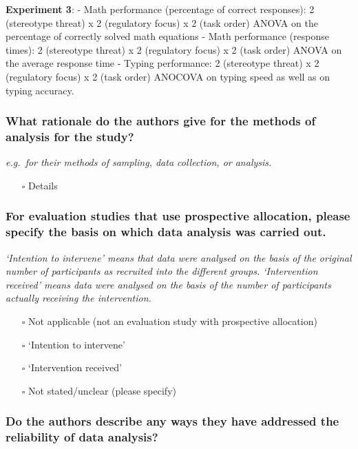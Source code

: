\documentclass[
  doc, a4paper]{apa7}
\providecommand{\tightlist}{%
  \setlength{\itemsep}{0pt}\setlength{\parskip}{0pt}}
\begin{document}
\textbf{Experiment 3}:
- Math performance (percentage of correct responses): 2 (stereotype threat) x 2 (regulatory focus) x 2 (task order) ANOVA on the percentage of correctly solved math equations
- Math performance (response times): 2 (stereotype threat) x 2 (regulatory focus) x 2 (task order) ANOVA on the average response time
- Typing performance: 2 (stereotype threat) x 2 (regulatory focus) x 2 (task order) ANOCOVA on typing speed as well as on typing accuracy.

\subsubsection{What rationale do the authors give for the methods of analysis for the study?}\label{what-rationale-do-the-authors-give-for-the-methods-of-analysis-for-the-study}

\emph{e.g.~for their methods of sampling, data collection, or analysis.}

\begin{itemize}
\tightlist
\item[$\square$]
  Details
\end{itemize}

\subsubsection{For evaluation studies that use prospective allocation, please specify the basis on which data analysis was carried out.}\label{for-evaluation-studies-that-use-prospective-allocation-please-specify-the-basis-on-which-data-analysis-was-carried-out.}

\emph{`Intention to intervene' means that data were analysed on the basis of the original number of participants as recruited into the different groups. `Intervention received' means data were analysed on the basis of the number of participants actually receiving the intervention.}

\begin{itemize}
\tightlist
\item[$\square$]
  Not applicable (not an evaluation study with prospective allocation)
\item[$\square$]
  `Intention to intervene'
\item[$\square$]
  `Intervention received'
\item[$\square$]
  Not stated/unclear (please specify)
\end{itemize}

\subsubsection{Do the authors describe any ways they have addressed the reliability of data analysis?}\label{do-the-authors-describe-any-ways-they-have-addressed-the-reliability-of-data-analysis}
\end{document}
